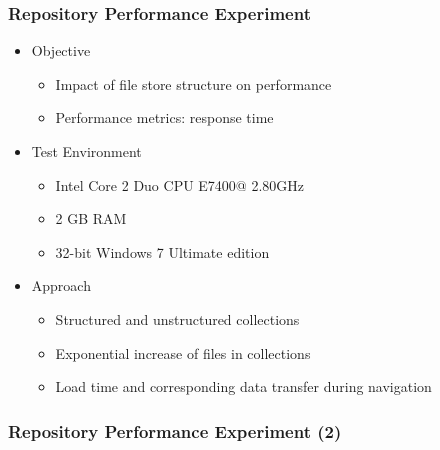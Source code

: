 \documentclass[xcolor=dvitex,t,11pt]{beamer}
\begin{document}
\begin{frame}[fragile]
\frametitle{Repository Performance Experiment}
\begin{itemize}
\item Objective
\begin{itemize}
\item Impact of file store structure on performance
\item Performance metrics: response time
\end{itemize}
\item Test Environment
\begin{itemize}
\item Intel Core 2 Duo CPU E7400@ 2.80GHz
\item 2 GB RAM
\item 32-bit Windows 7 Ultimate edition
\end{itemize} 
\item Approach
\begin{itemize}
\item Structured and unstructured collections
\item Exponential increase of files in collections
\item Load time and corresponding data transfer during navigation
\end{itemize}
\end{itemize}
\end{frame}


\begin{frame}[fragile]
\frametitle{Repository Performance Experiment (2)}
\centering

\end{frame}
\end{document}

